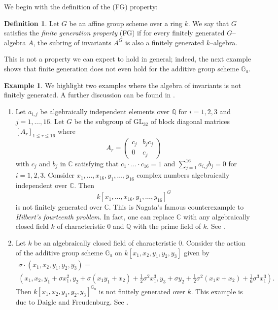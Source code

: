 \documentclass{article}
\theoremstyle{plain}
\theoremstyle{definition}
\newtheorem{Def}[Th]{Definition}
\newtheorem{Ex}[Th]{Example}
\newcommand{\GL}{\mathrm{GL}}
\begin{document}
We begin with the definition of the (FG) property:

\begin{Def}
    Let $G$ be an affine group scheme over a ring $k$. We say that $G$ satisfies the \textit{finite generation property} (FG) if for every finitely generated $G$--algebra $A$, the subring of invariants $A^G$ is also a finitely generated $k$--algebra.
\end{Def}



This is not a property we can expect to hold in general; indeed, the next example shows that finite generation does not even hold for the additive group scheme $\mathbb{G}_a$. 

\begin{Ex}\label{Ex: Nagata} We highlight two examples where the algebra of invariants is not finitely generated. A further discussion can be found in \cite[Section 2.1]{DK15}.

\begin{enumerate}
    \item Let $a_{i,j}$ be algebraically independent elements over  $\mathbb{Q}$ for $i=1,2,3$ and $j=1,\ldots, 16$. Let $G$ be the subgroup of $\GL_{32}$ of block diagonal matrices $[A_r]_{1\leq r\leq 16}$ where 
    \[A_r= \begin{pmatrix}
 c_j & b_j c_j \\
 0 & c_j
\end{pmatrix}\]  
with $c_j $ and $b_j$ in $\mathbb{C}$ satisfying that $c_1\cdot\ldots\cdot c_{16}=1$ and $\sum_{j=1}^{16}a_{i,j}b_j=0$ for $i=1,2,3$. Consider $x_1,\ldots,x_{16},y_1,\ldots,y_{16}$ complex numbers algebraically independent over $\mathbb{C}$. Then 
\[k[x_1,\ldots,x_{16},y_1,\ldots,y_{16}]^G\]
is not finitely generated over $\mathbb{C}$. This is Nagata's famous counterexample to \textit{Hilbert's fourteenth problem}. In fact, one can replace $\mathbb{C}$ with any algebraically closed field $k$ of characteristic 0 and $\mathbb{Q}$ with the prime field of $k$.  See \cite{Nag59}. 

\item Let $k$ be an algebraically closed field of characteristic 0. Consider the action of the additive group scheme $\mathbb{G}_a$ on $k[x_1,x_2,y_1,y_2,y_3]$ given by 
\begin{align*}
    \sigma\cdot(x_1,x_2,y_1,y_2,y_3) =  \\
 \left (x_1, x_2,y_1 + \sigma x_1^2 , y_2 +\sigma(x_1 y_1 + x_2) + \frac{1}{2}\sigma^2 x_1^3, y_3 + \sigma y_2 + \frac{1}{2}\sigma^2 ( x_1 x + x_2)+ \frac{1}{6}\sigma^3 x_1^3\right).
\end{align*}
Then $k[x_1,x_2,y_1,y_2,y_3]^{\mathbb{G}_a}$ is not finitely generated over $k$. This example is due to Daigle and Freudenburg. See \cite{DF99}.
\end{enumerate}
\end{Ex}
\end{document}
